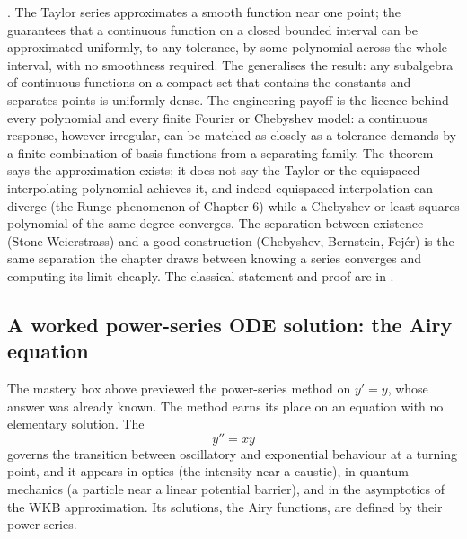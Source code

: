 \begin{mastery}
. The Taylor series approximates
a smooth function near one point; the  guarantees that a continuous function on a closed bounded
interval can be approximated uniformly, to any tolerance, by some
polynomial across the whole interval, with no smoothness required. The
 generalises the result: any
subalgebra of continuous functions on a compact set that contains the
constants and separates points is uniformly dense. The engineering
payoff is the licence behind every polynomial and every finite Fourier
or Chebyshev model: a continuous response, however irregular, can be
matched as closely as a tolerance demands by a finite combination of
basis functions from a separating family. The theorem says the
approximation exists; it does not say the Taylor or the equispaced
interpolating polynomial achieves it, and indeed equispaced
interpolation can diverge (the Runge phenomenon of Chapter 6) while a
Chebyshev or least-squares polynomial of the same degree converges. The
separation between existence (Stone-Weierstrass) and a good construction
(Chebyshev, Bernstein, Fej\'{e}r) is the same separation the chapter
draws between knowing a series converges and computing its limit
cheaply. The classical statement and proof are in
\cite{text:v2ch06-hairer-wanner-analysis}.
\end{mastery}

\subsection{A worked power-series ODE solution: the Airy equation}

The mastery box above previewed the power-series method on $y' = y$,
whose answer was already known. The method earns its place on an
equation with no elementary solution. The 
\[
y'' = x y
\]
governs the transition between oscillatory and exponential behaviour at
a turning point, and it appears in optics (the intensity near a caustic),
in quantum mechanics (a particle near a linear potential barrier), and
in the asymptotics of the WKB approximation. Its solutions, the Airy
functions, are defined by their power series.

